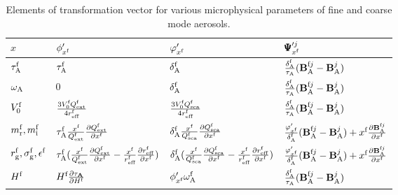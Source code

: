 \begin{table}[t]
  \centering
  \small
  \caption{Elements of transformation vector for various microphysical
parameters of fine and coarse mode aerosols.}
  \label{tab:jacobian2}
  \begin{tabular}{p{4em} p{10em} p{10em} p{11em} }
    \toprule
       $x$ & $\phi_{x^\text{f}}^\prime$ & $\varphi_{x^\text{f}}^\prime$ &
$\pmb{\Psi}_{x^\text{f}}^{\prime j}$ \\
    \midrule
    $\tau_\text{A}^\text{f}$ & $\tau_\text{A}^\text{f}$ & $\delta_\text{A}^\text{f}$ & 
    $\frac{\delta_\text{A}^\text{f}}{\tau_\text{A}}(\mathbf{B}_\text{A}^{\text{f}j}-\mathbf{B}_\text{A}^j)$ \\
    $\omega_\text{A}$ & 0 & $\delta_\text{A}^\text{f}$ &
    $\frac{\delta_\text{A}^\text{f}}{\tau_\text{A}}(\mathbf{B}_\text{A}^{\text{f}j}-\mathbf{B}_\text{A}^j)$ \\ 
    $V_0^\text{f}$ & $\frac{3V_0^\text{f}Q_\text{ext}^\text{f}}{4r_\text{eff}^\text{f}}$ &
    $\frac{3V_0^\text{f}Q_\text{sca}^\text{f}}{4r_\text{eff}^\text{f}}$ &
    $\frac{\delta_\text{A}^\text{f}}{\tau_\text{A}}(\mathbf{B}_\text{A}^{\text{f}j}-\mathbf{B}_\text{A}^j)$ \\ 
    $m_\text{r}^\text{f},m_\text{i}^\text{f}$ & 
    $\tau_\text{A}^\text{f}\frac{x^\text{f}}{Q_\text{ext}^\text{f}}\frac{\partial Q_\text{ext}^\text{f}}{\partial x^\text{f}}$ &
    $\delta_\text{A}^\text{f}\frac{x^\text{f}}{Q_\text{sca}^\text{f}}\frac{\partial Q_\text{sca}^\text{f}}{\partial x^\text{f}}$ & 
    $\frac{\varphi_{x^\text{f}}^\prime}{\delta_\text{A}^\text{f}}(\mathbf{B}_\text{A}^{\text{f}j}-\mathbf{B}_\text{A}^j)+x^\text{f}\frac{\partial\mathbf{B}_\text{A}^{\text{f}j}}{\partial x^\text{f}}$ \\
    $r_\text{g}^\text{f},\sigma_\text{g}^\text{f},\epsilon^\text{f}$ &
    $\tau_\text{A}^\text{f}(\frac{x^\text{f}}{Q_\text{ext}^\text{f}}\frac{\partial Q_\text{ext}^\text{f}}{\partial x^\text{f}}-\frac{x^\text{f}}{r_\text{eff}^\text{f}}\frac{\partial r_\text{eff}^\text{f}}{\partial x^\text{f}})$ & 
    $\delta_\text{A}^\text{f}(\frac{x^\text{f}}{Q_\text{sca}^\text{f}}\frac{\partial Q_\text{sca}^\text{f}}{\partial x^\text{f}}-\frac{x^\text{f}}{r_\text{eff}^\text{f}}\frac{\partial r_\text{eff}^\text{f}}{\partial x^\text{f}})$ &
    $\frac{\varphi_{x^\text{f}}^\prime}{\delta_\text{A}^\text{f}}(\mathbf{B}_\text{A}^{\text{f}j}-\mathbf{B}_\text{A}^j)+x^\text{f}\frac{\partial\mathbf{B}_\text{A}^{\text{f}j}}{\partial x^\text{f}}$ \\
    $H^\text{f}$ & $H^\text{f}\frac{\partial\tau_\mathbf{A}}{\partial{H^\text{f}}}$ &
    $\phi_{x^\text{f}}^\prime\omega_\text{A}^\text{f}$ &
    $\frac{\delta_\text{A}^\text{f}}{\tau_\text{A}}(\mathbf{B}_\text{A}^{\text{f}j}-\mathbf{B}_\text{A}^j)$ \\
    \bottomrule
  \end{tabular}
\end{table}

